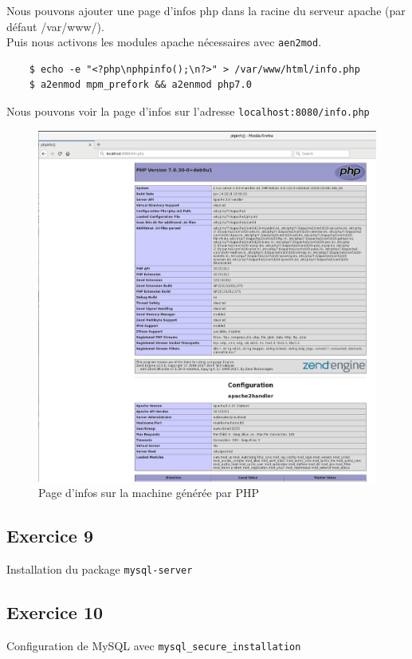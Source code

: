 \documentclass{report}
\begin{document}
Nous pouvons ajouter une page d'infos php dans la racine du serveur apache (par défaut /var/www/).\\
Puis nous activons les modules apache nécessaires avec \texttt{aen2mod}. \\
\begin{tcolorbox}
  \begin{verbatim}
    $ echo -e "<?php\nphpinfo();\n?>" > /var/www/html/info.php
    $ a2enmod mpm_prefork && a2enmod php7.0
  \end{verbatim}
\end{tcolorbox}
Nous pouvons voir la page d'infos sur l'adresse \texttt{localhost:8080/info.php}
\begin{figure}[!htp]
  \includegraphics[scale=0.25]{resources/03.png}
  \caption{Page d'infos sur la machine générée par PHP}
\end{figure}

\subsection{Exercice 9}
Installation du package \texttt{mysql-server}
\subsection{Exercice 10}
Configuration de MySQL avec \texttt{mysql\_secure\_installation}
\end{document}
